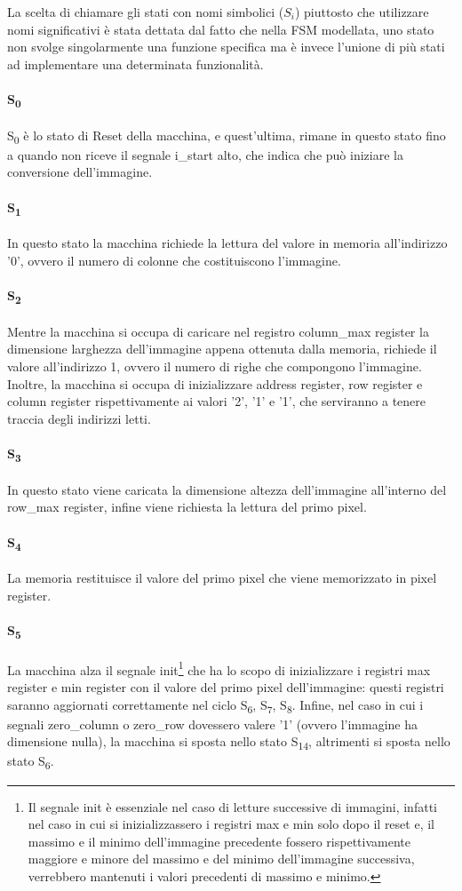 La scelta di chiamare gli stati con nomi simbolici ($S_i$) piuttosto che utilizzare nomi significativi è stata dettata dal fatto che nella FSM modellata, uno stato non svolge singolarmente una funzione specifica ma è invece l'unione di più stati ad implementare una determinata funzionalità.

\paragraph{S\textsubscript{0}}
S\textsubscript{0} è lo stato di Reset della macchina, e quest'ultima, rimane in questo stato fino a quando non riceve il segnale i\_start alto, che indica che può iniziare la conversione dell'immagine.
\paragraph{S\textsubscript{1}}
In questo stato la macchina richiede la lettura del valore in memoria all'indirizzo '0', ovvero il numero di colonne che costituiscono l'immagine.
\paragraph{S\textsubscript{2}}
Mentre la macchina si occupa di caricare nel registro column\_max register la dimensione larghezza dell'immagine appena ottenuta dalla memoria, richiede il valore all'indirizzo 1, ovvero il numero di righe che compongono l'immagine. Inoltre, la macchina si occupa di inizializzare address register, row register e column register rispettivamente ai valori '2', '1' e '1', che serviranno a tenere traccia degli indirizzi letti.
\paragraph{S\textsubscript{3}}
In questo stato viene caricata la dimensione altezza dell'immagine all'interno del row\_max register, infine viene richiesta la lettura del primo pixel.
\paragraph{S\textsubscript{4}}
La memoria restituisce il valore del primo pixel che viene memorizzato in pixel register.
\paragraph{S\textsubscript{5}}
La macchina alza il segnale init\footnote{Il segnale init è essenziale nel caso di letture successive di immagini, infatti nel caso in cui si inizializzassero i registri max e min solo dopo il reset e, il massimo e il minimo dell'immagine precedente fossero rispettivamente maggiore e minore del massimo e del minimo dell'immagine successiva, verrebbero mantenuti i valori precedenti di massimo e minimo.} che ha lo scopo di inizializzare i registri max register e min register con il valore del primo pixel dell'immagine: questi registri saranno aggiornati correttamente nel ciclo S\textsubscript{6}, S\textsubscript{7}, S\textsubscript{8}.
Infine, nel caso in cui i segnali zero\_column o zero\_row dovessero valere '1' (ovvero l'immagine ha dimensione nulla), la macchina si sposta nello stato S\textsubscript{14}, altrimenti si sposta nello stato S\textsubscript{6}.
